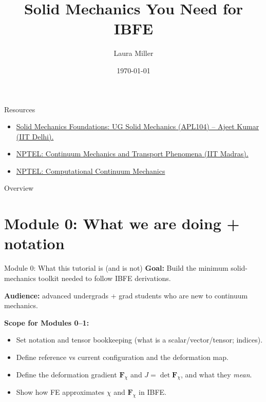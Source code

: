 \documentclass[aspectratio=169]{beamer}
\title[Solid Mechanics for IBFE]{Solid Mechanics You Need for IBFE}
\author{Laura Miller}
\institute{University of Arizona}
\date{\today}
\newcommand{\Fdef}{\bm{F}_{\chi}}  %
\begin{document}
\begin{frame}
  \titlepage
\end{frame}

\begin{frame}{Resources}
  \begin{itemize}
    \item \href{https://web.iitd.ac.in/~ajeetk/APL104.html}{Solid Mechanics Foundations: UG Solid Mechanics (APL104) – Ajeet Kumar (IIT Delhi).}
    \item \href{https://onlinecourses.nptel.ac.in/noc19_ch27/preview}{NPTEL: Continuum Mechanics and Transport Phenomena (IIT Madras).}
    \item \href{https://www.classcentral.com/course/youtube-modeling-hyperelastic-material-344875}{NPTEL: Computational Continuum Mechanics}
  \end{itemize}
\end{frame}

\begin{frame}{Overview}
\tableofcontents
\end{frame}
\section{Module 0: What we are doing + notation}

\begin{frame}{Module 0: What this tutorial is (and is not)}
\small
\textbf{Goal:} Build the minimum solid-mechanics toolkit needed to follow IBFE derivations.

\medskip
\textbf{Audience:} advanced undergrads + grad students who are new to continuum mechanics.

\medskip
\textbf{Scope for Modules 0--1:}
\begin{itemize}
\item Set notation and tensor bookkeeping (what is a scalar/vector/tensor; indices).
\item Define reference vs current configuration and the deformation map.
\item Define the deformation gradient \(\Fdef\) and \(J=\det \Fdef\), and what they \emph{mean}.
\item Show how FE approximates \(\chi\) and \(\Fdef\) in IBFE.
\end{itemize}

\end{frame}
\end{document}
